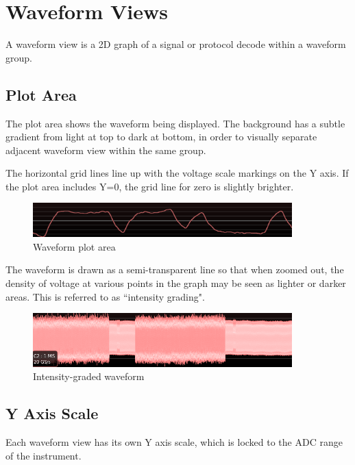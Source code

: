 \section{Waveform Views}

A waveform view is a 2D graph of a signal or protocol decode within a waveform group.

\subsection{Plot Area}

The plot area shows the waveform being displayed. The background has a subtle gradient from light at top to dark at
bottom, in order to visually separate adjacent waveform view within the same group.

The horizontal grid lines line up with the voltage scale markings on the Y axis. If the plot area includes Y=0, the
grid line for zero is slightly brighter.

\begin{figure}[H]
\centering
\includegraphics[width=10cm]{images/waveform-graph.png}
\caption{Waveform plot area}
\label{waveform-graph}
\end{figure}

The waveform is drawn as a semi-transparent line so that when zoomed out, the density of voltage at various points in
the graph may be seen as lighter or darker areas. This is referred to as ``intensity grading".

\begin{figure}[H]
\centering
\includegraphics[width=10cm]{images/graded-waveform.png}
\caption{Intensity-graded waveform}
\label{graded-waveform2}
\end{figure}

\subsection{Y Axis Scale}

Each waveform view has its own Y axis scale, which is locked to the ADC range of the instrument.

